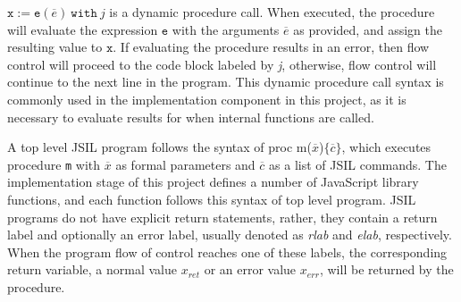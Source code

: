 \documentclass[a4paper,11pt,twoside]{report}
\begin{document}
$\mathtt{x} := \mathtt{e}(\overline{e})\ \mathtt{with}\ \textit{j}$ is a dynamic procedure call. When executed, the procedure will evaluate the expression $\mathtt{e}$ with the arguments $\overline{e}$ as provided, and assign the resulting value to $\mathtt{x}$. If evaluating the procedure results in an error, then flow control will proceed to the code block labeled by \textit{j}, otherwise, flow control will continue to the next line in the program. This dynamic procedure call syntax is commonly used in the implementation component in this project, as it is necessary to evaluate results for when internal functions are called.

A top level JSIL program follows the syntax of proc m($\overline{x}$)$\{\overline{c}\}$, which executes procedure \texttt{m} with $\overline{x}$ as formal parameters and $\overline{c}$ as a list of JSIL commands. The implementation stage of this project defines a number of JavaScript library functions, and each function follows this syntax of top level program. JSIL programs do not have explicit return statements, rather, they contain a return label and optionally an error label, usually denoted as \textit{rlab} and \textit{elab}, respectively. When the program flow of control reaches one of these labels, the corresponding return variable, a normal value $x_{ret}$ or an error value $x_{err}$, will be returned by the procedure.
\end{document}
